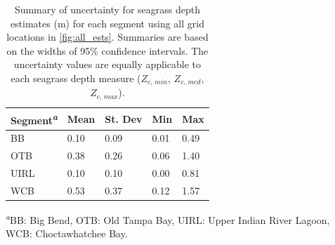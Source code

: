 \documentclass[letterpaper,12pt,oneside]{article}\usepackage[]{graphicx}\usepackage[]{color}
\begin{document}
\begin{table}[!tbp]
\caption{Summary of uncertainty for seagrass depth estimates (m) for each segment using all grid locations in \cref{fig:all_ests}.  Summaries are based on the widths of 95\% confidence intervals.  The uncertainty values are equally applicable to each seagrass depth measure ($Z_{c,\,min}$, $Z_{c,\,med}$, $Z_{c,\,max}$).\label{tab:sens_summ}} 
\begin{center}
\begin{tabular}{lllll}
\hline\hline
\multicolumn{1}{l}{Segment\textsuperscript{\textit{a}}}&\multicolumn{1}{c}{Mean}&\multicolumn{1}{c}{St. Dev}&\multicolumn{1}{c}{Min}&\multicolumn{1}{c}{Max}\tabularnewline
\hline
BB&0.10&0.09&0.01&0.49\tabularnewline
OTB&0.38&0.26&0.06&1.40\tabularnewline
UIRL&0.10&0.10&0.00&0.81\tabularnewline
WCB&0.53&0.37&0.12&1.57\tabularnewline
\hline
\end{tabular}\end{center}

\textsuperscript{\textit{a}}\footnotesize BB: Big Bend, OTB: Old Tampa Bay, UIRL: Upper Indian River Lagoon, WCB: Choctawhatchee Bay.\end{table}
\end{document}
